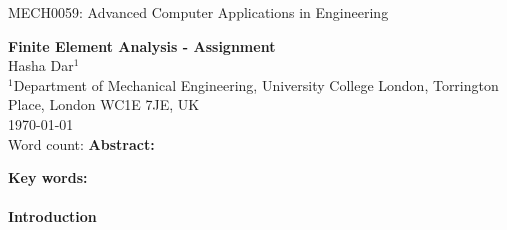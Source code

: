 \documentclass[11pt]{article}
\begin{document}
MECH0059: Advanced Computer Applications in Engineering

\textbf{Finite Element Analysis - Assignment}\\

Hasha Dar$^1$\\

$^1$Department of Mechanical Engineering, University College London, Torrington Place, London WC1E 7JE, UK\\

\today\\

Word count:
\newpage
\textbf{Abstract:}

\textbf{Key words:}\\
\\

\textbf{Introduction}
\end{document}
